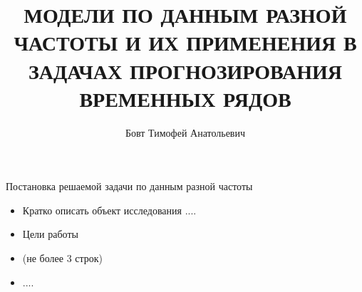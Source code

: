 \documentclass[notheorems]{beamer}
\title[Модели по данным разной частоты]{\Large МОДЕЛИ ПО ДАННЫМ РАЗНОЙ ЧАСТОТЫ И ИХ ПРИМЕНЕНИЯ В ЗАДАЧАХ ПРОГНОЗИРОВАНИЯ ВРЕМЕННЫХ РЯДОВ}
\author[Т. А. Бовт]{Бовт Тимофей Анатольевич}
\institute[]{Научный руководитель: В.И. Малюгин}
\date[]{}%
\begin{document}
\begin{frame}[plain]
  \titlepage
\end{frame}


\begin{frame}{Постановка решаемой задачи по данным разной частоты}

\begin{itemize}

\item Кратко описать объект исследования .... \vfill

\item Цели работы  \vfill

\item (не более 3 строк)\vfill

\item ....

\end{itemize}

\end{frame}

\end{document}
